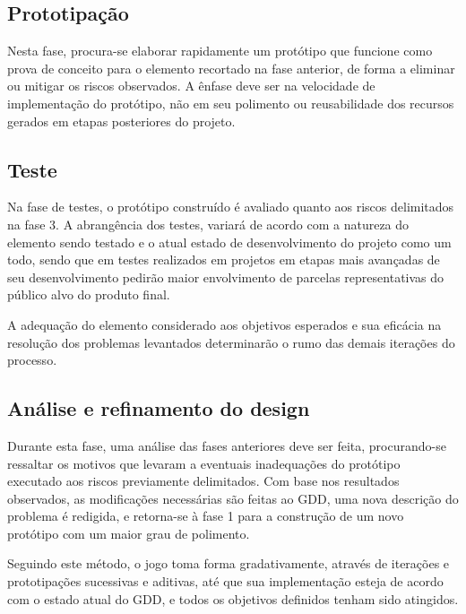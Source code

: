 \subsection{Prototipação}\label{subsec-met-prototipacao}

Nesta fase, procura-se elaborar rapidamente um protótipo que funcione como prova de conceito para o elemento recortado na fase anterior, de forma a eliminar ou mitigar os riscos observados. A ênfase deve ser na velocidade de implementação do protótipo, não em seu polimento ou reusabilidade dos recursos gerados em etapas posteriores do projeto.

\subsection{Teste}\label{subsec-met-teste}

Na fase de testes, o protótipo construído é avaliado quanto aos riscos delimitados na fase 3. A abrangência dos testes, variará de acordo com a natureza do elemento sendo testado e o atual estado de desenvolvimento do projeto como um todo, sendo que em testes realizados em projetos em etapas mais avançadas de seu desenvolvimento pedirão maior envolvimento de parcelas representativas do público alvo do produto final.

A adequação do elemento considerado aos objetivos esperados e sua eficácia na resolução dos problemas levantados determinarão o rumo das demais iterações do processo.

\subsection{Análise e refinamento do design}\label{subsec-met-analise-refinamento}

Durante esta fase, uma análise das fases anteriores deve ser feita, procurando-se ressaltar os motivos que levaram a eventuais inadequações do protótipo executado aos riscos previamente delimitados. Com base nos resultados observados, as modificações necessárias são feitas ao GDD, uma nova descrição do problema é redigida, e retorna-se à fase 1 para a construção de um novo protótipo com um maior grau de polimento.

Seguindo este método, o jogo toma forma gradativamente, através de iterações e prototipações sucessivas e aditivas, até que sua implementação esteja de acordo com o estado atual do GDD, e todos os objetivos definidos tenham sido atingidos.
